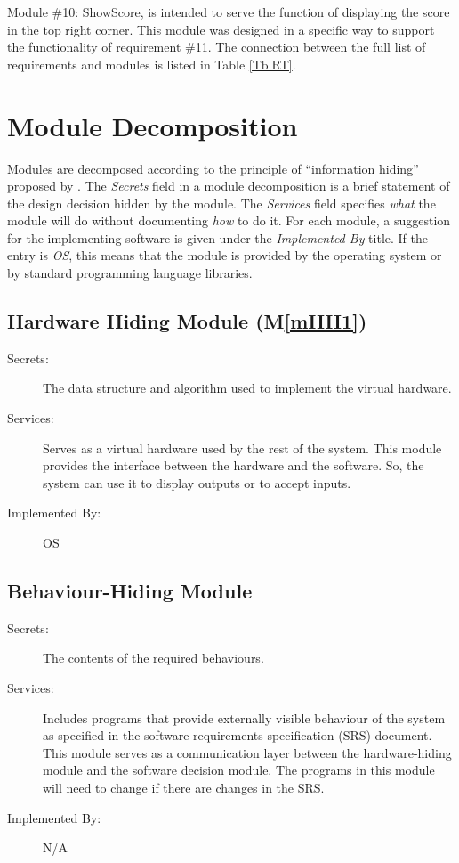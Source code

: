 \documentclass[12pt, titlepage]{article}
\newcommand{\mref}[1]{M\ref{#1}}
\begin{document}
Module \#10: ShowScore, is intended to serve the function of displaying the score in the top right corner. This module was designed in a specific way to support the functionality of requirement \#11. The connection between the full list of requirements and modules is listed in Table \ref{TblRT}.

\section{Module Decomposition} \label{SecMD}

Modules are decomposed according to the principle of ``information hiding''
proposed by \citet{ParnasEtAl1984}. The \emph{Secrets} field in a module
decomposition is a brief statement of the design decision hidden by the
module. The \emph{Services} field specifies \emph{what} the module will do
without documenting \emph{how} to do it. For each module, a suggestion for the
implementing software is given under the \emph{Implemented By} title. If the
entry is \emph{OS}, this means that the module is provided by the operating
system or by standard programming language libraries.

\subsection{Hardware Hiding Module (\mref{mHH1})}
\begin{description}
\item[Secrets:]The data structure and algorithm used to implement the virtual
  hardware.
\item[Services:]Serves as a virtual hardware used by the rest of the
  system. This module provides the interface between the hardware and the
  software. So, the system can use it to display outputs or to accept inputs.
\item[Implemented By:] OS
\end{description}

\subsection{Behaviour-Hiding Module}
\begin{description}
\item[Secrets:]The contents of the required behaviours.
\item[Services:]Includes programs that provide externally visible behaviour of
  the system as specified in the software requirements specification (SRS)
  document. This module serves as a communication layer between the
  hardware-hiding module and the software decision module. The programs in this
  module will need to change if there are changes in the SRS.
\item[Implemented By:] N/A
\end{description}
\end{document}
